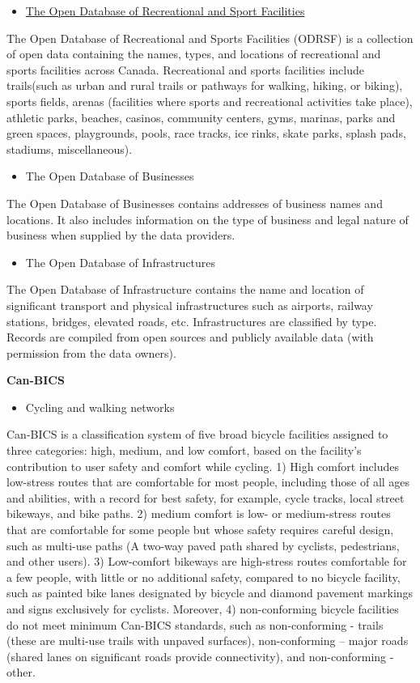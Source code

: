 \documentclass[12pt,twoside]{reedthesis}
\providecommand{\tightlist}{%
  \setlength{\itemsep}{0pt}\setlength{\parskip}{0pt}}
\begin{document}
\begin{itemize}
\tightlist
\item
  \href{https://www.statcan.gc.ca/en/lode/databases/odrsf}{The Open Database of Recreational and Sport Facilities}
\end{itemize}
The Open Database of Recreational and Sports Facilities (ODRSF) is a collection of open data containing the names, types, and locations of recreational and sports facilities across Canada. Recreational and sports facilities include trails(such as urban and rural trails or pathways for walking, hiking, or biking), sports fields, arenas (facilities where sports and recreational activities take place), athletic parks, beaches, casinos, community centers, gyms, marinas, parks and green spaces, playgrounds, pools, race tracks, ice rinks, skate parks, splash pads, stadiums, miscellaneous).
\begin{itemize}
\tightlist
\item
  The Open Database of Businesses
\end{itemize}
The Open Database of Businesses contains addresses of business names and locations. It also includes information on the type of business and legal nature of business when supplied by the data providers.
\begin{itemize}
\tightlist
\item
  The Open Database of Infrastructures
\end{itemize}
The Open Database of Infrastructure contains the name and location of significant transport and physical infrastructures such as airports, railway stations, bridges, elevated roads, etc. Infrastructures are classified by type. Records are compiled from open sources and publicly available data (with permission from the data owners).

\newpage

\textbf{Can-BICS}
\begin{itemize}
\tightlist
\item
  Cycling and walking networks
\end{itemize}
Can-BICS is a classification system of five broad bicycle facilities assigned to three categories: high, medium, and low comfort, based on the facility's contribution to user safety and comfort while cycling. 1) High comfort includes low-stress routes that are comfortable for most people, including those of all ages and abilities, with a record for best safety, for example, cycle tracks, local street bikeways, and bike paths. 2) medium comfort is low- or medium-stress routes that are comfortable for some people but whose safety requires careful design, such as multi-use paths (A two-way paved path shared by cyclists, pedestrians, and other users). 3) Low-comfort bikeways are high-stress routes comfortable for a few people, with little or no additional safety, compared to no bicycle facility, such as painted bike lanes designated by bicycle and diamond pavement markings and signs exclusively for cyclists. Moreover, 4) non-conforming bicycle facilities do not meet minimum Can-BICS standards, such as non-conforming - trails (these are multi-use trails with unpaved surfaces), non-conforming -- major roads (shared lanes on significant roads provide connectivity), and non-conforming - other.
\end{document}
